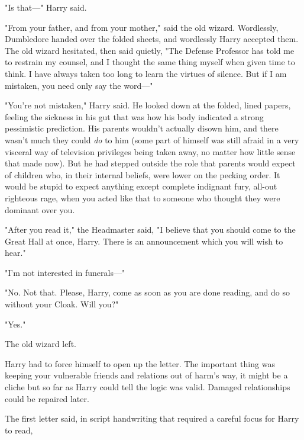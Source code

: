 "Is that—" Harry said.

"From your father, and from your mother," said the old wizard. Wordlessly,
Dumbledore handed over the folded sheets, and wordlessly Harry accepted them.
The old wizard hesitated, then said quietly, "The Defense Professor has told me
to restrain my counsel, and I thought the same thing myself when given time to
think. I have always taken too long to learn the virtues of silence. But if I
am mistaken, you need only say the word—"

"You're not mistaken," Harry said. He looked down at the folded, lined papers,
feeling the sickness in his gut that was how his body indicated a strong
pessimistic prediction. His parents wouldn't actually disown him, and there
wasn't much they could \emph{do} to him (some part of himself was still afraid
in a very visceral way of television privileges being taken away, no matter how
little sense that made now). But he had stepped outside the role that parents
would expect of children who, in their internal beliefs, were lower on the
pecking order. It would be stupid to expect anything except complete indignant
fury, all-out righteous rage, when you acted like that to someone who thought
they were dominant over you.

"After you read it," the Headmaster said, "I believe that you should come to
the Great Hall at once, Harry. There is an announcement which you will wish to
hear."

"I'm not interested in funerals—"

"No. Not that. Please, Harry, come as soon as you are done reading, and do so
without your Cloak. Will you?"

"Yes."

The old wizard left.

Harry had to force himself to open up the letter. The important thing was
keeping your vulnerable friends and relations out of harm's way, it might be a
cliche but so far as Harry could tell the logic was valid. Damaged
relationships could be repaired later.

The first letter said, in script handwriting that required a careful focus for
Harry to read,

